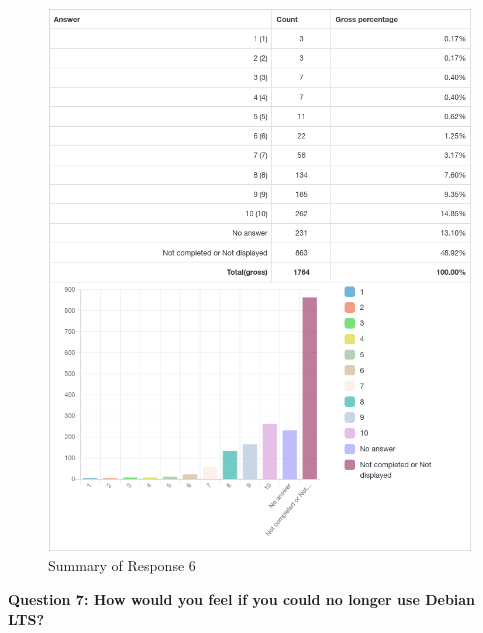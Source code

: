 \documentclass{article}
\begin{document}
\vspace{3mm}
\begin{figure}[h!]
\centering
\includegraphics[width=16.5cm]{assets/6-summary.png}
\caption{Summary of Response 6}
\end{figure}

\newpage

\Large{\textbf{Question 7: How would you feel if you could no longer use Debian LTS?}}
\end{document}
